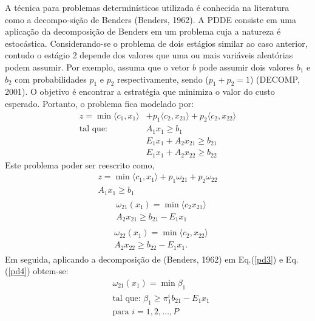 \documentclass[12pt,fleqn]{article}
\begin{document}
A t\'ecnica para problemas determin\'isticos utilizada \'e conhecida na literatura como a decompo-si\c c\~ao de Benders
(Benders, 1962). A PDDE consiste em uma aplica\c c\~ao da decomposi\c c\~ao de Benders em um problema cuja a
natureza \'e
estoc\'astica. Considerando-se o problema de dois est\'agios similar ao caso anterior, contudo o  est\'agio 2 depende dos valores
que uma ou mais vari\'aveis aleat\'orias podem assumir. Por exemplo, assuma que o vetor $b$ pode assumir dois valores $b_1$ e $b_2$ com
probabilidades $p_1$ e $p_2$ respectivamente, sendo ($p_1 + p_2 = 1$) (DECOMP, 2001). O objetivo \'e encontrar a estrat\'egia que minimiza o
valor do custo esperado. Portanto, o problema fica modelado por:
{\setlength{\belowdisplayskip}{0pt}
\begin{align*}
  z = \min  \langle c_1,x_1\rangle &+ p_1\langle c_2,x_{21}\rangle + p_2\langle c_2,x_{22}\rangle \nonumber\\	
 \mbox{tal que: }&	A_1 x_1 \geq b_1\nonumber \\
	&E_1 x_1 + A_2 x_{21} \geq b_{21} \nonumber\\
	&E_1 x_1 + A_2x_{22} \geq b_{22}
  	\label{pd1}
\end{align*}}%
 Este problema poder ser reescrito como,
{\setlength{\belowdisplayskip}{-4pt}
\begin{align*}
  z = \min  \langle c_1,x_1\rangle + p_1{\omega}_{21} + p_2 {\omega}_{22} \nonumber \\	
	A_1 x_1 \geq b_1
  \end{align*}}%
{\setlength{\abovedisplayskip}{-6pt}
 \setlength{\belowdisplayskip}{0pt}
\begin{align}
  \begin{split}	
  &\omega_{21}(x_1) =\min \langle c_2x_{21}\rangle \\
	& A_2 x_{21} \geq b_{21} - E_1 x_1 
  \end{split}
      \label{pd3}
	\end{align}}%
{\setlength{\abovedisplayskip}{0pt}
\begin{align}
  \begin{split}	
 	&\omega_{22}(x_1) = \min  \langle c_2,x_{22}\rangle \\
	&A_2x_{22} \geq b_{22} - E_1 x_1. 
  \end{split}
     \label{pd4}
   \end{align}}%
Em seguida, aplicando a decomposi\c c\~ao de (Benders, 1962) em Eq.(\ref {pd3}) e Eq.(\ref {pd4}) obtem-se:  
{\setlength{\belowdisplayskip}{-4pt}
\begin{align*}
&\omega_{21}(x_1) = \min  \beta_{1}\nonumber \\
	&\mbox{tal que: }\beta_{1}  \geq {\pi}_{1}^{i}b_{21} - E_1 x_1 \nonumber\\
	&\mbox{para }i = 1,2,\dots, P 
  \end{align*}}%
\end{document}
